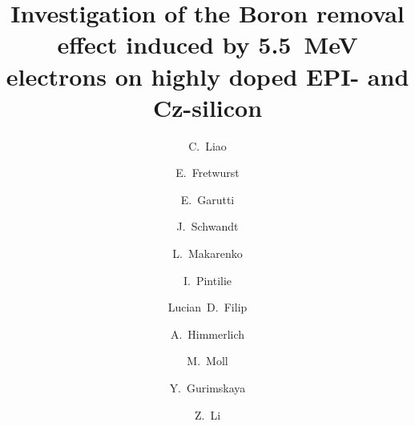 \documentclass[final, 5p, times]{elsarticle}
\begin{document}
\begin{frontmatter}

\title{Investigation of the Boron removal effect induced by \SI{5.5}{\mega\electronvolt} electrons on highly doped EPI- and Cz-silicon}

\author[mymainaddress]{C.~Liao}

\author[mymainaddress]{E.~Fretwurst}
\author[mymainaddress]{E.~Garutti}
\author[mymainaddress]{J.~Schwandt}
\author[mysecondaryaddress]{L.~Makarenko}

\author[mythirdaddress]{I.~Pintilie}

\author[mythirdaddress]{Lucian~D.~Filip}
\author[myfourthaddress]{A.~Himmerlich}
\author[myfourthaddress]{M.~Moll}
\author[myfourthaddress]{Y.~Gurimskaya}
\author[myfifthaddress]{Z.~Li}

\address[mymainaddress]{Institute for Experimental Physics, University of
Hamburg, Hamburg, Germany}
\address[mysecondaryaddress]{Belorussian State University, Minks, Belarus}
\address[mythirdaddress]{National Institute of Materials Physics, Bucharest,
Romania}
\address[myfourthaddress]{European Organization for Nuclear Research (CERN),
Geneva, Switzerland}
\address[myfifthaddress]{College of physics and optoelectronic engineering,
Ludong University, Yantai, China}


\end{frontmatter}
\end{document}
